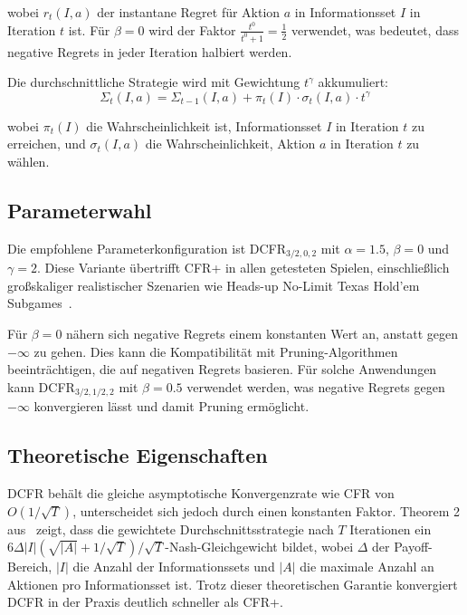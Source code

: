 wobei $r_t(I, a)$ der instantane Regret für Aktion $a$ in Informationsset $I$ in Iteration $t$ ist.
Für $\beta = 0$ wird der Faktor $\frac{t^0}{t^0 + 1} = \frac{1}{2}$ verwendet, was bedeutet, dass negative Regrets in jeder Iteration halbiert werden.

Die durchschnittliche Strategie wird mit Gewichtung $t^\gamma$ akkumuliert:
\begin{equation}
    \Sigma_t(I, a) = \Sigma_{t-1}(I, a) + \pi_t(I) \cdot \sigma_t(I, a) \cdot t^\gamma \label{eq:dcfr_strategy}
\end{equation}

wobei $\pi_t(I)$ die Wahrscheinlichkeit ist, Informationsset $I$ in Iteration $t$ zu erreichen, und $\sigma_t(I, a)$ die Wahrscheinlichkeit, Aktion $a$ in Iteration $t$ zu wählen.

\subsection{Parameterwahl}

Die empfohlene Parameterkonfiguration ist DCFR$_{3/2,0,2}$ mit $\alpha = 1.5$, $\beta = 0$ und $\gamma = 2$.
Diese Variante übertrifft CFR+ in allen getesteten Spielen, einschließlich großskaliger realistischer Szenarien wie Heads-up No-Limit Texas Hold'em Subgames~\cite{brown2018discounted}.

Für $\beta = 0$ nähern sich negative Regrets einem konstanten Wert an, anstatt gegen $-\infty$ zu gehen.
Dies kann die Kompatibilität mit Pruning-Algorithmen beeinträchtigen, die auf negativen Regrets basieren.
Für solche Anwendungen kann DCFR$_{3/2,1/2,2}$ mit $\beta = 0.5$ verwendet werden, was negative Regrets gegen $-\infty$ konvergieren lässt und damit Pruning ermöglicht.

\subsection{Theoretische Eigenschaften}

DCFR behält die gleiche asymptotische Konvergenzrate wie CFR von $O(1/\sqrt{T})$, unterscheidet sich jedoch durch einen konstanten Faktor.
Theorem 2 aus~\cite{brown2018discounted} zeigt, dass die gewichtete Durchschnittsstrategie nach $T$ Iterationen ein $6\Delta|I|(\sqrt{|A|} + 1/\sqrt{T})/\sqrt{T}$-Nash-Gleichgewicht bildet, wobei $\Delta$ der Payoff-Bereich, $|I|$ die Anzahl der Informationssets und $|A|$ die maximale Anzahl an Aktionen pro Informationsset ist.
Trotz dieser theoretischen Garantie konvergiert DCFR in der Praxis deutlich schneller als CFR+.
